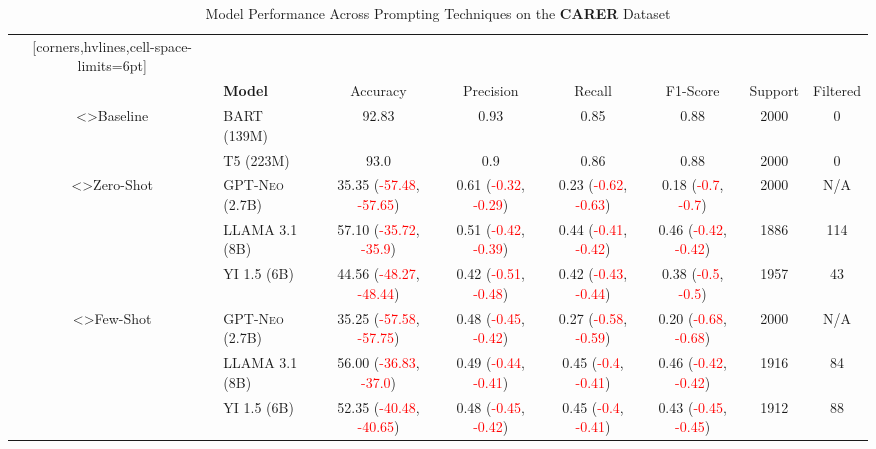 \documentclass[twocolumn]{article}
\begin{document}
\onecolumn

\newpage

\begin{sidewaystable}[ht]
\centering
\caption{Model Performance Across Prompting Techniques on the \textbf{CARER} Dataset}
\vspace{10pt}
\label{tab:model_performance_carer}
\begin{NiceTabular}{cl*{6}{c}}[corners,hvlines,cell-space-limits=6pt]
    &   
        &  \\
    & \textbf{Model}  
        & Accuracy & Precision & Recall & F1-Score & Support & Filtered \\

<\rotate>{Baseline}
	 & \textsc{BART (139M)} & 92.83 & 0.93 & 0.85 & 0.88 & 2000 & 0 \\
	 & \textsc{T5 (223M)} & 93.0 & 0.9 & 0.86 & 0.88 & 2000 & 0 \\

<\rotate>{Zero-Shot}
	 & \textsc{GPT-Neo (2.7B)} & 35.35 (\textcolor{Red}{-57.48}, \textcolor{Red}{-57.65}) & 0.61 (\textcolor{Red}{-0.32}, \textcolor{Red}{-0.29}) & 0.23 (\textcolor{Red}{-0.62}, \textcolor{Red}{-0.63}) & 0.18 (\textcolor{Red}{-0.7}, \textcolor{Red}{-0.7}) & 2000 & N/A \\
	 & \textsc{LLAMA 3.1 (8B)} & 57.10 (\textcolor{Red}{-35.72}, \textcolor{Red}{-35.9}) & 0.51 (\textcolor{Red}{-0.42}, \textcolor{Red}{-0.39}) & 0.44 (\textcolor{Red}{-0.41}, \textcolor{Red}{-0.42}) & 0.46 (\textcolor{Red}{-0.42}, \textcolor{Red}{-0.42}) & 1886 & 114 \\
	 & \textsc{YI 1.5 (6B)} & 44.56 (\textcolor{Red}{-48.27}, \textcolor{Red}{-48.44}) & 0.42 (\textcolor{Red}{-0.51}, \textcolor{Red}{-0.48}) & 0.42 (\textcolor{Red}{-0.43}, \textcolor{Red}{-0.44}) & 0.38 (\textcolor{Red}{-0.5}, \textcolor{Red}{-0.5}) & 1957 & 43 \\

<\rotate>{Few-Shot}
	 & \textsc{GPT-Neo (2.7B)} & 35.25 (\textcolor{Red}{-57.58}, \textcolor{Red}{-57.75}) & 0.48 (\textcolor{Red}{-0.45}, \textcolor{Red}{-0.42}) & 0.27 (\textcolor{Red}{-0.58}, \textcolor{Red}{-0.59}) & 0.20 (\textcolor{Red}{-0.68}, \textcolor{Red}{-0.68}) & 2000 & N/A \\
	 & \textsc{LLAMA 3.1 (8B)} & 56.00 (\textcolor{Red}{-36.83}, \textcolor{Red}{-37.0}) & 0.49 (\textcolor{Red}{-0.44}, \textcolor{Red}{-0.41}) & 0.45 (\textcolor{Red}{-0.4}, \textcolor{Red}{-0.41}) & 0.46 (\textcolor{Red}{-0.42}, \textcolor{Red}{-0.42}) & 1916 & 84 \\
	 & \textsc{YI 1.5 (6B)} & 52.35 (\textcolor{Red}{-40.48}, \textcolor{Red}{-40.65}) & 0.48 (\textcolor{Red}{-0.45}, \textcolor{Red}{-0.42}) & 0.45 (\textcolor{Red}{-0.4}, \textcolor{Red}{-0.41}) & 0.43 (\textcolor{Red}{-0.45}, \textcolor{Red}{-0.45}) & 1912 & 88 \\


\end{NiceTabular}
\end{sidewaystable}
\end{document}
